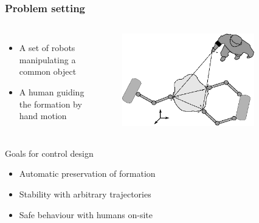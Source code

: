 \documentclass[student]{ITRslides}
\begin{document}
\begin{frame}
	\frametitle{Problem setting}
		\begin{columns}
	\begin{itemize}
	\item A set of robots manipulating a common object
	\item A human guiding the formation by hand motion
	\end{itemize}
		
	
	
			\begin{figure}
			\centering
			\includegraphics[width=0.8\textwidth]{general_setup.eps}

			\end{figure}
	\end{columns}
	\vspace{10pt}
	\begin{block}{Goals for control design}
	\begin{itemize}
	\item Automatic preservation of formation 
	\item Stability with arbitrary trajectories
	\item Safe behaviour with humans on-site
	\end{itemize}
	\end{block}	

\end{frame}
\end{document}
